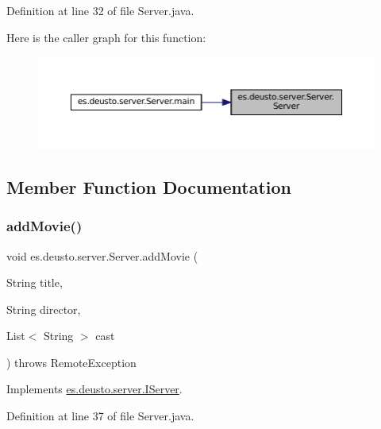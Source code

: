 Definition at line 32 of file Server.\+java.

Here is the caller graph for this function\+:\nopagebreak
\begin{figure}[H]
\begin{center}
\leavevmode
\includegraphics[width=350pt]{classes_1_1deusto_1_1server_1_1_server_a84f78162a65dd737f224eb2f94c43023_icgraph}
\end{center}
\end{figure}


\subsection{Member Function Documentation}
\mbox{\label{classes_1_1deusto_1_1server_1_1_server_a150317903dc393d29f39db81e79131e0}} 
\subsubsection{\texorpdfstring{addMovie()}{addMovie()}\hspace{0.1cm}{\footnotesize\ttfamily [1/2]}}
{\footnotesize\ttfamily void es.\+deusto.\+server.\+Server.\+add\+Movie (\begin{DoxyParamCaption}\item[{String}]{title,  }\item[{String}]{director,  }\item[{List$<$ String $>$}]{cast }\end{DoxyParamCaption}) throws Remote\+Exception}



Implements \mbox{\hyperlink{interfacees_1_1deusto_1_1server_1_1_i_server_a393d8689e14b3534dfa425e4c900532e}{es.\+deusto.\+server.\+I\+Server}}.



Definition at line 37 of file Server.\+java.

